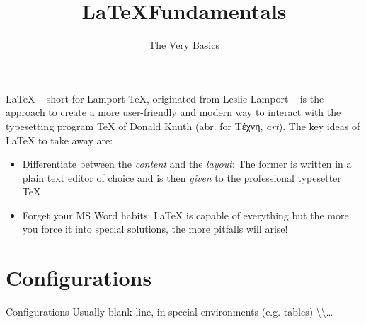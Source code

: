 

\title{\LaTeX Fundamentals}
\subtitle{The Very Basics}
\date{}



\pagestyle{empty}
\backgroundframe
\maketitle
%

%
\LaTeX{} -- short for Lamport-\TeX{}, originated from Leslie Lamport -- is the approach to create a more user-friendly and modern way to interact with the typesetting program \TeX{} of Donald Knuth (abr. for \textgreek{Τέχνη}, \textit{art}).
%
The key ideas of \LaTeX{} to take away are:
%
\begin{itemize}
  \item Differentiate between the \textit{content} and the \textit{layout}: The former is written in a plain text editor of choice and is then \textit{given} to the professional typesetter \TeX{}.
  \item Forget your MS Word habits: \LaTeX{} is capable of everything but the more you force it into special solutions, the more pitfalls will arise!
\end{itemize}

\section*{Configurations}
%
Configurations
Usually blank line, in special environments (e.g. tables) \textbackslash\textbackslash \ldots




